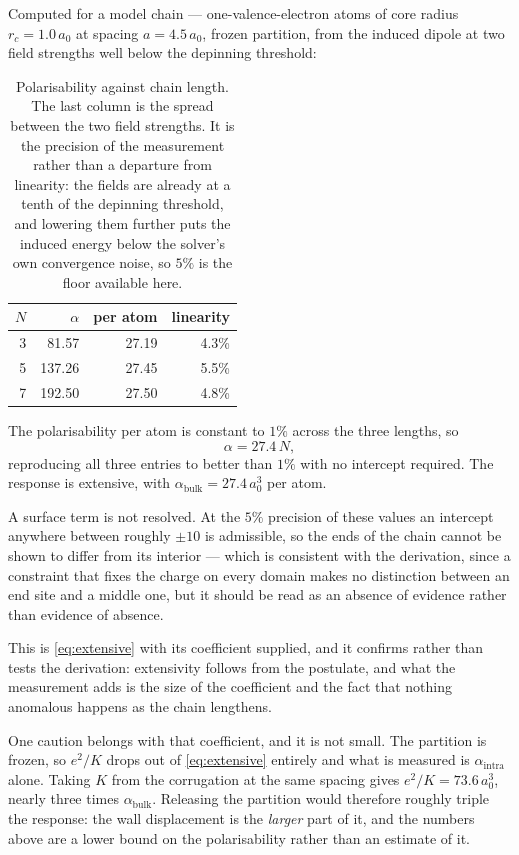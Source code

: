 \documentclass[11pt]{article}
\begin{document}
Computed for a model chain --- one-valence-electron atoms of core
radius $r_c=1.0\,a_0$ at spacing $a=4.5\,a_0$, frozen partition, from the induced dipole at two
field strengths well below the depinning threshold:

\begin{table}[h]
\centering
\begin{tabular}{rrrr}
\toprule
$N$ & $\alpha$ & per atom & linearity \\
\midrule
3 & 81.57 & 27.19 & 4.3\% \\
5 & 137.26 & 27.45 & 5.5\% \\
7 & 192.50 & 27.50 & 4.8\% \\
\bottomrule
\end{tabular}
\caption{Polarisability against chain length. The last column is the spread between the two field
strengths. It is the precision of the measurement rather than a departure from linearity: the
fields are already at a tenth of the depinning threshold, and lowering them further puts the
induced energy below the solver's own convergence noise, so $5\%$ is the floor available here.}
\label{tab:chainN}
\end{table}

The polarisability per atom is constant to $1\%$ across the three lengths, so
\begin{equation}
\alpha = 27.4\,N,
\label{eq:alphafit}
\end{equation}
reproducing all three entries to better than $1\%$ with no intercept required. The response is
extensive, with $\alpha_{\text{bulk}} = 27.4\,a_0^3$ per atom.

A surface term is not resolved. At the $5\%$ precision of these values an intercept anywhere
between roughly $\pm 10$ is admissible, so the ends of the chain cannot be shown to differ from its
interior --- which is consistent with the derivation, since a constraint that fixes the charge on
every domain makes no distinction between an end site and a middle one, but it should be read as
an absence of evidence rather than evidence of absence.

This is \eqref{eq:extensive} with its coefficient supplied, and it confirms rather than tests the
derivation: extensivity follows from the postulate, and what the measurement adds is the size of
the coefficient and the fact that nothing anomalous happens as the chain lengthens.

One caution belongs with that coefficient, and it is not small. The partition is frozen, so
$e^2/K$ drops out of \eqref{eq:extensive} entirely and what is measured is $\alpha_{\text{intra}}$
alone. Taking $K$ from the corrugation at the same spacing gives $e^2/K = 73.6\,a_0^3$,
nearly three times $\alpha_{\text{bulk}}$. Releasing the partition would therefore roughly triple
the response: the wall displacement is the \emph{larger} part of it, and the numbers above are a
lower bound on the polarisability rather than an estimate of it.
\end{document}

